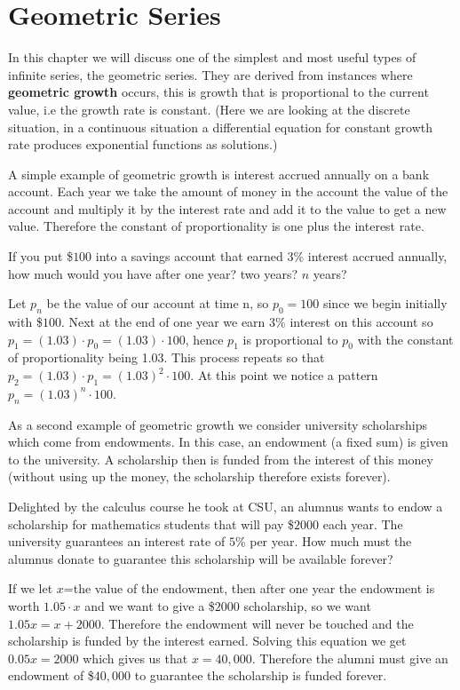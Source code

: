 \chapter{Geometric Series}

In this chapter we will discuss one of the simplest and most useful
types of infinite series, the geometric series.  They are derived
from instances where \textbf{geometric growth} occurs, this is growth that
is proportional to the current value, i.e the growth rate is constant. (Here
we are looking at the discrete situation, in a continuous situation a
differential equation for constant growth rate produces exponential
functions as solutions.)

A simple example of geometric growth is
interest accrued annually on a bank account.  Each year we take the
amount of money in the account the value of the account and multiply
it by the interest rate and add it to the value to get a new value.
Therefore the constant of proportionality is one plus the interest
rate.
\begin{Example}
If you put {\$}$100$ into a savings account that earned $3$\% interest
accrued annually, how much would you have after one year? two years?
$n$ years?

\solution
Let $p_{n}$ be the value of our account at time n, so $p_{0}=100$
since we begin initially with {\$}$100$.  Next at the end of one year we
earn 3\% interest on this account so $p_{1}=(1.03)\cdot p_{0}=(1.03)
\cdot 100$, hence $p_{1}$ is proportional to $p_{0}$ with the
constant of proportionality being 1.03. This process repeats so that
$p_{2}=(1.03) \cdot p_{1}=(1.03)^{2} \cdot 100$.  At this point we
notice a pattern $p_{n}=(1.03)^{n} \cdot 100$.
\end{Example}

As a second example of geometric growth we consider university
scholarships which come from endowments.  In this case, an endowment (a
fixed sum)
is given to the university. A scholarship then is funded from the interest
of this money (without using up the money, the scholarship therefore exists
forever).

\begin{Example}[Endowments]
Delighted by the calculus course he took at CSU, an alumnus wants to endow a
scholarship for mathematics students that will pay {\$}$2000$ each year. The
university guarantees an interest rate of $5$\% per year.
How much must the alumnus donate to guarantee this
scholarship will be available forever?

\solution
If we let $x$=the value of the endowment, then after one year the
endowment is worth $1.05 \cdot x$ and we want to give a {\$}$2000$
scholarship, so we want $1.05x=x+2000$.  Therefore the endowment
will never be touched and the scholarship is funded by the interest
earned.  Solving this equation we get $0.05x=2000$ which gives us
that $x=40,000$.  Therefore the alumni must give an endowment of
{\$}$40,000$ to guarantee the scholarship is funded forever.
\end{Example}
\medskip

